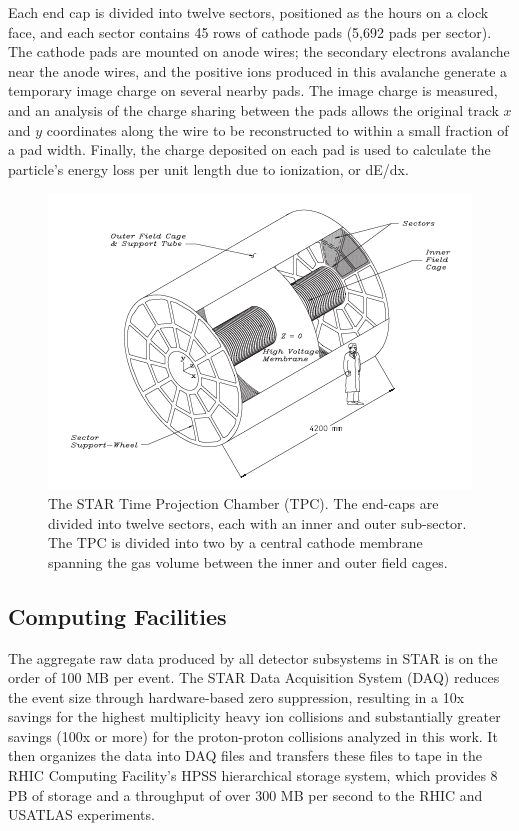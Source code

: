 Each end cap is divided into twelve sectors, positioned as the hours on a
clock face, and each sector contains 45 rows of cathode pads (5,692 pads per
sector). The cathode pads are mounted on anode wires; the secondary electrons
avalanche near the anode wires, and the positive ions produced in this
avalanche generate a temporary image charge on several nearby pads. The image
charge is measured, and an analysis of the charge sharing between the pads
allows the original track $x$ and $y$ coordinates along the wire to be
reconstructed to within a small fraction of a pad width. Finally, the charge
deposited on each pad is used to calculate the particle's energy loss per unit
length due to ionization, or dE/dx.

\begin{figure}
  \includegraphics[width=1.0\textwidth]{figures/tpc}
  \caption{The STAR Time Projection Chamber (TPC). The end-caps are divided
  into twelve sectors, each with an inner and outer sub-sector. The TPC is
  divided into two by a central cathode membrane spanning the gas volume
  between the inner and outer field cages.}
  \label{fig:tpc}
\end{figure}

\subsection{Computing Facilities}

The aggregate raw data produced by all detector subsystems in STAR is on the
order of 100 MB per event. The STAR Data Acquisition System (DAQ)
\cite{Landgraf:2002zw} reduces the event size through hardware-based zero
suppression, resulting in a 10x savings for the highest multiplicity heavy ion
collisions and substantially greater savings (100x or more) for the
proton-proton collisions analyzed in this work. It then organizes the data
into DAQ files and transfers these files to tape in the RHIC Computing
Facility's HPSS hierarchical storage system, which provides 8 PB of storage
and a throughput of over 300 MB per second to the RHIC and USATLAS
experiments.

